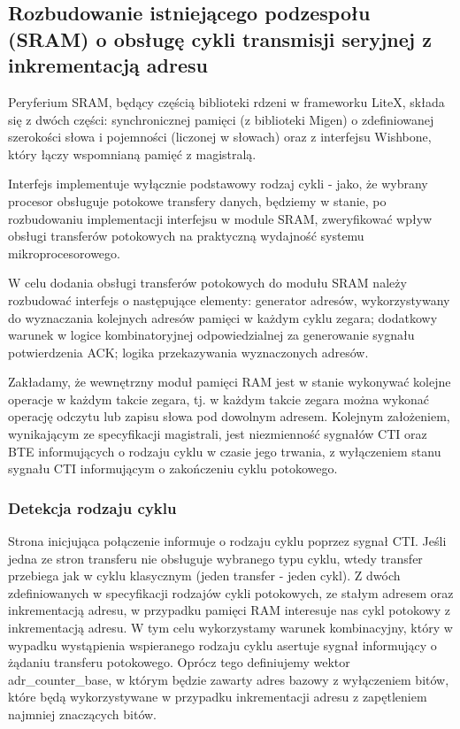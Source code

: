 
\subsection{Rozbudowanie istniejącego podzespołu (SRAM) o obsługę cykli transmisji seryjnej z inkrementacją adresu}

Peryferium SRAM, będący częścią biblioteki rdzeni w frameworku LiteX, składa się z dwóch części: synchronicznej pamięci (z biblioteki Migen) o zdefiniowanej szerokości słowa i pojemności (liczonej w słowach) oraz z interfejsu Wishbone, który łączy wspomnianą pamięć z magistralą.


Interfejs implementuje wyłącznie podstawowy rodzaj cykli - jako, że wybrany procesor obsługuje potokowe transfery danych, będziemy w stanie, po rozbudowaniu implementacji interfejsu w module SRAM, zweryfikować wpływ obsługi transferów potokowych na praktyczną wydajność systemu mikroprocesorowego.

W celu dodania obsługi transferów potokowych do modułu SRAM należy rozbudować interfejs o następujące elementy: generator adresów, wykorzystywany do wyznaczania kolejnych adresów pamięci w każdym cyklu zegara; dodatkowy warunek w logice kombinatoryjnej odpowiedzialnej za generowanie sygnału potwierdzenia ACK; logika przekazywania wyznaczonych adresów.

Zakładamy, że wewnętrzny moduł pamięci RAM jest w stanie wykonywać kolejne operacje w każdym takcie zegara, tj. w każdym takcie zegara można wykonać operację odczytu lub zapisu słowa pod dowolnym adresem.
Kolejnym założeniem, wynikającym ze specyfikacji magistrali, jest niezmienność sygnałów CTI oraz BTE informujących o rodzaju cyklu w czasie jego trwania, z wyłączeniem stanu sygnału CTI informującym o zakończeniu cyklu potokowego.

\subsubsection{Detekcja rodzaju cyklu}

Strona inicjująca połączenie informuje o rodzaju cyklu poprzez sygnał CTI. Jeśli jedna ze stron transferu nie obsługuje wybranego typu cyklu, wtedy transfer przebiega jak w cyklu klasycznym (jeden transfer - jeden cykl).
Z dwóch zdefiniowanych w specyfikacji rodzajów cykli potokowych, ze stałym adresem oraz inkrementacją adresu, w przypadku pamięci RAM interesuje nas cykl potokowy z inkrementacją adresu. W tym celu wykorzystamy warunek kombinacyjny, który w wypadku wystąpienia wspieranego rodzaju cyklu asertuje sygnał informujący o żądaniu transferu potokowego.
Oprócz tego definiujemy wektor adr_counter_base, w którym będzie zawarty adres bazowy z wyłączeniem bitów, które będą wykorzystywane w przypadku inkrementacji adresu z zapętleniem najmniej znaczących bitów.

